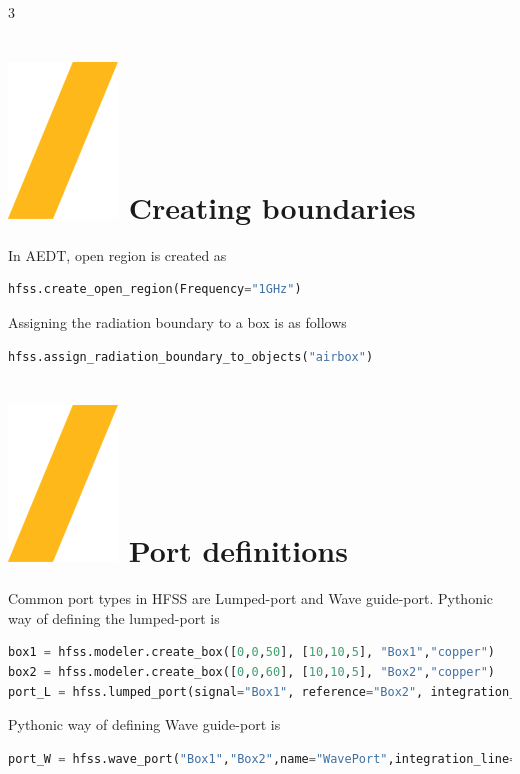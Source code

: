 \documentclass[9pt,landscape]{article}
\begin{document}
\begin{multicols}{3}
\section{\includegraphics[height=\fontcharht\font`\S]{slash.png} Creating boundaries}
In AEDT, open region is created as
\begin{lstlisting}[language=Python]
hfss.create_open_region(Frequency="1GHz")
\end{lstlisting}
Assigning the radiation boundary to a box is as follows
\begin{lstlisting}[language=Python]
hfss.assign_radiation_boundary_to_objects("airbox")
\end{lstlisting}

\section{\includegraphics[height=\fontcharht\font`\S]{slash.png} Port definitions}
Common port types in HFSS are Lumped-port and Wave guide-port. Pythonic way of defining the lumped-port is
\begin{lstlisting}[language=Python]
box1 = hfss.modeler.create_box([0,0,50], [10,10,5], "Box1","copper")
box2 = hfss.modeler.create_box([0,0,60], [10,10,5], "Box2","copper")
port_L = hfss.lumped_port(signal="Box1", reference="Box2", integration_line=hfss.AxisDir.XNeg, impedance=50, name="LumpedPort", renormalize=True, deembed=False)
\end{lstlisting}
Pythonic way of defining Wave guide-port is
\begin{lstlisting}[language=Python]
port_W = hfss.wave_port("Box1","Box2",name="WavePort",integration_line=1)
\end{lstlisting}


\end{multicols}
\end{document}
